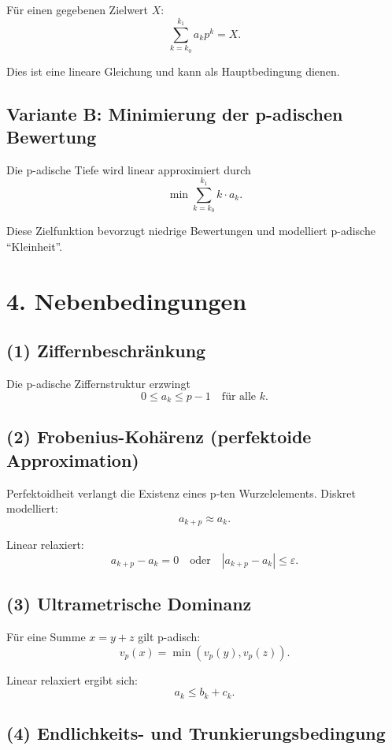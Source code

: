 \documentclass[11pt]{article}
\begin{document}
Für einen gegebenen Zielwert \(X\):
\[
\sum_{k=k_0}^{k_1} a_k p^k = X.
\]

Dies ist eine lineare Gleichung und kann als Hauptbedingung dienen.

\subsection*{Variante B: Minimierung der p-adischen Bewertung}

Die p-adische Tiefe wird linear approximiert durch
\[
\min \sum_{k=k_0}^{k_1} k \cdot a_k.
\]

Diese Zielfunktion bevorzugt niedrige Bewertungen
und modelliert p-adische ``Kleinheit''.

\section*{4. Nebenbedingungen}

\subsection*{(1) Ziffernbeschränkung}

Die p-adische Ziffernstruktur erzwingt
\[
0 \le a_k \le p-1
\quad \text{für alle } k.
\]

\subsection*{(2) Frobenius-Kohärenz (perfektoide Approximation)}

Perfektoidheit verlangt die Existenz eines p-ten Wurzelelements.
Diskret modelliert:
\[
a_{k+p} \approx a_k.
\]

Linear relaxiert:
\[
a_{k+p} - a_k = 0
\quad \text{oder} \quad
|a_{k+p} - a_k| \le \varepsilon.
\]

\subsection*{(3) Ultrametrische Dominanz}

Für eine Summe \(x = y + z\) gilt p-adisch:
\[
v_p(x) = \min(v_p(y), v_p(z)).
\]

Linear relaxiert ergibt sich:
\[
a_k \le b_k + c_k.
\]

\subsection*{(4) Endlichkeits- und Trunkierungsbedingung}
\end{document}
